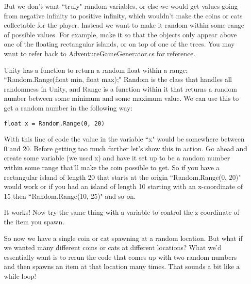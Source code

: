 \documentclass{article}
\begin{document}
But we don't want ``truly" random variables, or else we would get values going from negative infinity to positive infinity, which wouldn't make the coins or cats collectable for the player. Instead we want to make it random within some range of possible values. For example, make it so that the objects only appear above one of the floating rectangular islands, or on top of one of the trees. You may want to refer back to AdventureGameGenerator.cs for reference.

Unity has a function to return a random float within a range: ``Random.Range(float min, float max);" Random is the class that handles all randomness in Unity, and Range is a function within it that returns a random number between some minimum and some maximum value. We can use this to get a random number in the following way: 

\lstset{style=sharpc}
\begin{lstlisting}
float x = Random.Range(0, 20)
\end{lstlisting}

With this line of code the value in the variable ``x" would be somewhere between 0 and 20. Before getting too much further let's show this in action. Go ahead and create some variable (we used x) and have it set up to be a random number within some range that'll make the coin possible to get. So if you have a rectangular island of length 20 that starts at the origin ``Random.Range(0, 20)" would work or if you had an island of length 10 starting with an x-coordinate of 15 then ``Random.Range(10, 25)" and so on. 

\noindent{}

It works! Now try the same thing with a variable to control the z-coordinate of the item you spawn. 

\noindent{}

So now we have a single coin or cat spawning at a random location. But what if we wanted many different coins or cats at different locations? What we'd essentially want is to rerun the code that comes up with two random numbers and then spawns an item at that location many times. That sounds a bit like a while loop! 
\end{document}
